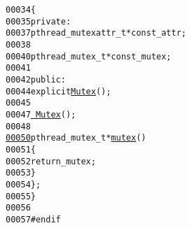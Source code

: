 \begin{footnotesize}
\begin{alltt}
00034     \{
00035         \textcolor{keyword}{private}:
00037             pthread\_mutexattr\_t * \textcolor{keyword}{const} \_attr;
00038 
00040             pthread\_mutex\_t * \textcolor{keyword}{const} \_mutex;
00041 
00042         \textcolor{keyword}{public}:
00044             \textcolor{keyword}{explicit} \hyperlink{classeos_1_1Mutex_a3d07ba9ee73a295bc98250bd33825375}{Mutex}();
00045 
00047             \hyperlink{classeos_1_1Mutex_ab721ec095c12b464fd178bb2fc80496a}{~Mutex}();
00048 
\hypertarget{mutex_8hh_source_l00050}{}\hyperlink{classeos_1_1Mutex_a7f5648012d5eb8577a0e4c1b62a0ea38}{00050}             pthread\_mutex\_t * \hyperlink{classeos_1_1Mutex_a7f5648012d5eb8577a0e4c1b62a0ea38}{mutex}()
00051             \{
00052                 \textcolor{keywordflow}{return} \_mutex;
00053             \}
00054     \};
00055 \}
00056 
00057 \textcolor{preprocessor}{#endif}
\end{alltt}\end{footnotesize}
